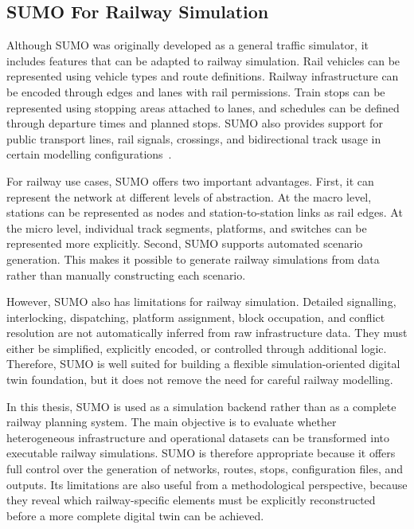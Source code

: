 \subsection{SUMO For Railway Simulation}
Although SUMO was originally developed as a general traffic simulator, it includes features that can be adapted to railway 
simulation. Rail vehicles can be represented using vehicle types and route definitions. Railway infrastructure can be 
encoded through edges and lanes with rail permissions. Train stops can be represented using stopping areas attached to 
lanes, and schedules can be defined through departure times and planned stops. SUMO also provides support for public 
transport lines, rail signals, crossings, and bidirectional track usage in certain modelling 
configurations~\cite{sumo_docs, sumo_railways}.

\newpage

For railway use cases, SUMO offers two important advantages. First, it can represent the network at different levels of 
abstraction. At the macro level, stations can be represented as nodes and station-to-station links as rail edges. At the 
micro level, individual track segments, platforms, and switches can be represented more explicitly. Second, SUMO supports 
automated scenario generation. This makes it possible to generate railway simulations from data rather than manually 
constructing each scenario.

However, SUMO also has limitations for railway simulation. Detailed signalling, interlocking, dispatching, platform 
assignment, block occupation, and conflict resolution are not automatically inferred from raw infrastructure data. They 
must either be simplified, explicitly encoded, or controlled through additional logic. Therefore, SUMO is well suited for 
building a flexible simulation-oriented digital twin foundation, but it does not remove the need for careful railway 
modelling.

In this thesis, SUMO is used as a simulation backend rather than as a complete railway planning system. The main objective 
is to evaluate whether heterogeneous infrastructure and operational datasets can be transformed into executable railway 
simulations. SUMO is therefore appropriate because it offers full control over the generation of networks, routes, stops, 
configuration files, and outputs. Its limitations are also useful from a methodological perspective, because they reveal 
which railway-specific elements must be explicitly reconstructed before a more complete digital twin can be achieved.

